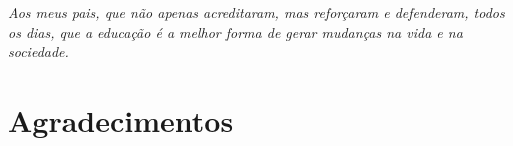 
\begin{titlepage}

\vspace*{\fill}

\hfill
\begin{minipage}{0.5\linewidth}
\begin{flushright}
\large\it
Aos meus pais, que não apenas acreditaram, mas reforçaram e defenderam, todos os dias, que a educação é a melhor forma de gerar mudanças na vida e na sociedade.
\end{flushright}
\end{minipage}

\vspace*{\fill}

\end{titlepage}

%
%


\chapter*{Agradecimentos}
\thispagestyle{empty}

